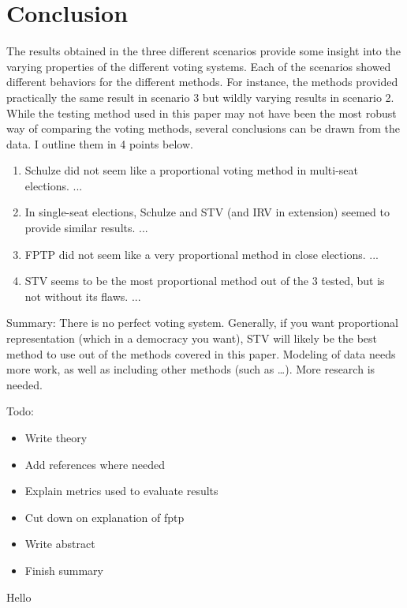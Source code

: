 \documentclass[12pt]{article}
\begin{document}
\section{Conclusion}
The results obtained in the three different scenarios provide some insight into the varying properties of the different voting systems. Each of the scenarios showed different behaviors for the different methods. For instance, the methods provided practically the same result in scenario 3 but wildly varying results in scenario 2. While the testing method used in this paper may not have been the most robust way of comparing the voting methods, several conclusions can be drawn from the data. I outline them in 4 points below.
\begin{enumerate}
	\item Schulze did not seem like a proportional voting method in multi-seat elections. ...
	\item In single-seat elections, Schulze and STV (and IRV in extension) seemed to provide similar results. ...
	\item FPTP did not seem like a very proportional method in close elections. ...
	\item STV seems to be the most proportional method out of the 3 tested, but is not without its flaws. ...
\end{enumerate}
Summary:
There is no perfect voting system. Generally, if you want proportional representation (which in a democracy you want), STV will likely be the best method to use out of the methods covered in this paper.
Modeling of data needs more work, as well as including other methods (such as \ldots). More research is needed.

Todo:
\begin{itemize}
	\item Write theory
	\item Add references where needed
	\item Explain metrics used to evaluate results
	\item Cut down on explanation of fptp
	\item Write abstract
	\item Finish summary
\end{itemize}

Hello

\pagebreak

\printbibliography{}
\end{document}
